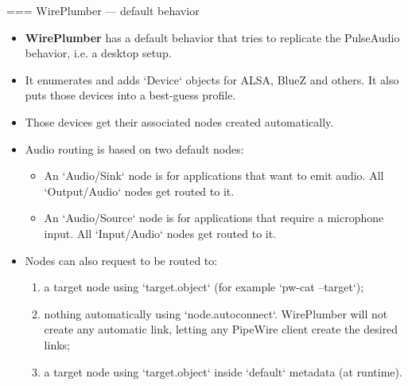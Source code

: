 === {WirePlumber — default behavior}
  \begin{itemize}

  \item \textbf{WirePlumber} has a default behavior that tries to
    replicate the PulseAudio behavior, i.e. a desktop setup.

  \item It enumerates and adds `Device` objects for ALSA, BlueZ
    and others. It also puts those devices into a best-guess profile.

  \item Those devices get their associated nodes created automatically.

  \item Audio routing is based on two default nodes:

    \begin{itemize}
    \item An `Audio/Sink` node is for applications that want to
      emit audio. All `Output/Audio` nodes get routed to it.
    \item An `Audio/Source` node is for applications that require a
      microphone input. All `Input/Audio` nodes get routed to it.
    \end{itemize}

  \item Nodes can also request to be routed to:

    \begin{enumerate}
    \item a target node using `target.object` (for example
      `pw-cat --target`);
    \item nothing automatically using `node.autoconnect`.
      WirePlumber will not create any automatic link, letting any
      PipeWire client create the desired links;
    \item a target node using `target.object` inside `default`
      metadata (at runtime).
    \end{enumerate}

  \end{itemize}




